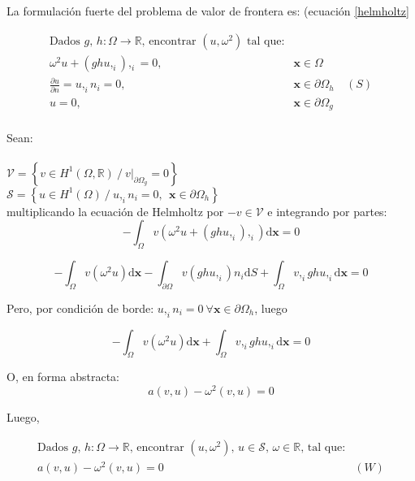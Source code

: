 La formulación fuerte del problema de valor de frontera es: (ecuaci\'on \eqref{helmholtz}

\begin{align*}
\text{Dados $g$, $h: \Omega \rightarrow \mathbb{R}$, encontrar $(u, \omega^2)$ tal que:}\\
\omega^2 u + (gh u,_i),_i  = 0, \ \ \ \ & \boldsymbol{x} \in \Omega \\
\frac{\partial u}{\partial n} = u,_i n_i = 0, \ \ \ \ & \boldsymbol{x} \in \partial \Omega_h \ & (S) \\
u=0, \ \ \ \ &\boldsymbol{x} \in \partial \Omega_g\\
\end{align*}

Sean:\\ \\
$ \mathcal{V} = \left \{ v \in H^1 (\Omega, \mathbb{R}) \ /\  v|_{\partial \Omega_g} = 0 \right \}$\\
$ \mathcal{S} = \left \{ u \in H^1 (\Omega) \ /\  u,_i n_i = 0, \ \ \boldsymbol{x} \in \partial \Omega_h \right \}$\\ 

multiplicando la ecuaci\'on de Helmholtz por $-v \in \mathcal{V}$ e integrando por partes:\\

$$-\int_{\Omega} v \left( \omega^2 u + (gh u,_i),_i \right) \mathrm{d}\boldsymbol{x} = 0$$

$$-\int_{\Omega} v ( \omega^2 u )\mathrm{d}\boldsymbol{x} -\int_{\partial \Omega} v (gh u,_i) n_i \mathrm{d} S
+\int_{\Omega} v,_i g h u,_i \mathrm{d}\boldsymbol{x} = 0$$

Pero, por condici\'on de borde: $u,_i n_i = 0 \ \forall \boldsymbol{x} \in \partial \Omega_h$, luego

$$-\int_{\Omega} v ( \omega^2 u )\mathrm{d}\boldsymbol{x} 
+\int_{\Omega} v,_i g h u,_i \mathrm{d}\boldsymbol{x} = 0$$

O, en forma abstracta:
\begin{equation}
a(v, u) - \omega^2 (v, u) = 0
\label{eq:debil_abstracta}
\end{equation}

Luego, 

\begin{align*}
\text{Dados $g$, $h: \Omega \rightarrow \mathbb{R}$, encontrar $(u, \omega^2)$, $u \in \mathcal{S} $, $\omega \in \mathbb{R}$, tal que:}\\
a(v, u) - \omega^2 (v, u) = 0 \ \ \ \ \  & (W) \\
\end{align*}

